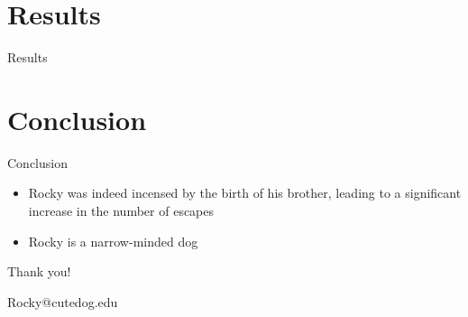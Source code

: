 \documentclass{article}
\begin{document}
\section{Results}
\begin{frame}{Results}

\end{frame}

\section{Conclusion}
\begin{frame}{Conclusion}
\begin{itemize}
    \item Rocky was indeed incensed by the birth of his brother, leading to a significant increase in the number of escapes
    \item  Rocky is a narrow-minded dog
\end{itemize}
    
\end{frame}


\begin{frame}
 \begin{center}
		{\Huge Thank you!}\\
		\bigskip\bigskip %
		
		{\LARGE Rocky@cutedog.edu}
		
	\end{center}
\end{frame}
\end{document}
